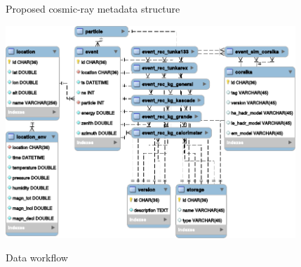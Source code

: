 
    \begin{frame}{Proposed cosmic-ray metadata structure}
        \vspace{-1.5em}
        \begin{center}
            \includegraphics[width=0.82\textwidth]{pics/metadata.pdf}
        \end{center}
    \end{frame}

    \begin{frame}{Data workflow}
        \vspace{-2em}
        \centering
    \end{frame}

